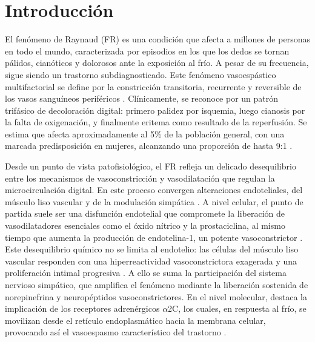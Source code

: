 \section{Introducción}

El fenómeno de Raynaud (FR) es una condición que afecta a millones de personas en todo el mundo, caracterizada por episodios en los que los dedos se tornan pálidos, cianóticos y dolorosos ante la exposición al frío. A pesar de su frecuencia, sigue siendo un trastorno subdiagnosticado. Este fenómeno vasoespástico multifactorial se define por la constricción transitoria, recurrente y reversible de los vasos sanguíneos periféricos \cite{Nawaz2022, Herrick2012}. Clínicamente, se reconoce por un patrón trifásico de decoloración digital: primero palidez por isquemia, luego cianosis por la falta de oxigenación, y finalmente eritema como resultado de la reperfusión. Se estima que afecta aproximadamente al 5\% de la población general, con una marcada predisposición en mujeres, alcanzando una proporción de hasta 9:1 \cite{Medscape2024, Musa2023, Garner2015, Ingegnoli2022}.  

Desde un punto de vista patofisiológico, el FR refleja un delicado desequilibrio entre los mecanismos de vasoconstricción y vasodilatación que regulan la microcirculación digital. En este proceso convergen alteraciones endoteliales, del músculo liso vascular y de la modulación simpática \cite{Herrick2005, Flavahan2015}. A nivel celular, el punto de partida suele ser una disfunción endotelial que compromete la liberación de vasodilatadores esenciales como el óxido nítrico y la prostaciclina, al mismo tiempo que aumenta la producción de endotelina-1, un potente vasoconstrictor \cite{Flavahan2008, Blann1993, Freedman1999}. Este desequilibrio químico no se limita al endotelio: las células del músculo liso vascular responden con una hiperreactividad vasoconstrictora exagerada y una proliferación intimal progresiva \cite{Fardoun2016, Cooke2004}. A ello se suma la participación del sistema nervioso simpático, que amplifica el fenómeno mediante la liberación sostenida de norepinefrina y neuropéptidos vasoconstrictores. En el nivel molecular, destaca la implicación de los receptores adrenérgicos $\alpha$2C, los cuales, en respuesta al frío, se movilizan desde el retículo endoplasmático hacia la membrana celular, provocando así el vasoespasmo característico del trastorno \cite{Fardoun2016, Flavahan2008, Chotani2000}.  

